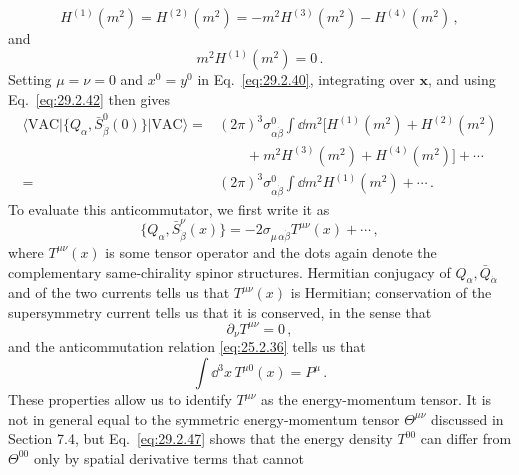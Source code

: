 \begin{equation}
  H^{(1)}(m^2)
  =H^{(2)}(m^2)
  =-m^2H^{(3)}(m^2)-H^{(4)}(m^2)\,,
  \tag{29.2.42}\label{eq:29.2.42}
\end{equation}
and
\begin{equation}
  m^2H^{(1)}(m^2)=0\,.
  \tag{29.2.43}\label{eq:29.2.43}
\end{equation}
Setting \(\mu=\nu=0\) and \(x^0=y^0\) in Eq.~\eqref{eq:29.2.40},
integrating over \(\mathbf x\), and using Eq.~\eqref{eq:29.2.42} then
gives
\begin{equation}
  \begin{aligned}
  \langle\mathrm{VAC}\lvert
  \{Q_\alpha,\bar S^0_{\dot\beta}(0)\}
  \rvert\mathrm{VAC}\rangle
  ={}&(2\pi)^3\sigma^0_{\alpha\dot\beta}\int \dd m^2
  \bigl[
    H^{(1)}(m^2)+H^{(2)}(m^2)
  \\
  &\qquad
    +m^2H^{(3)}(m^2)+H^{(4)}(m^2)
  \bigr]
  +\cdots
  \\
  ={}&(2\pi)^3\sigma^0_{\alpha\dot\beta}
    \int \dd m^2H^{(1)}(m^2)+\cdots\,.
  \end{aligned}
  \tag{29.2.44}\label{eq:29.2.44}
\end{equation}
To evaluate this anticommutator, we first write it as
\begin{equation}
  \{Q_\alpha,\bar S^\nu_{\dot\beta}(x)\}
  =-2\sigma_{\mu\,\alpha\dot\beta}T^{\mu\nu}(x)+\cdots\,,
  \tag{29.2.45}\label{eq:29.2.45}
\end{equation}
where \(T^{\mu\nu}(x)\) is some tensor operator and the dots again denote
the complementary same-chirality spinor structures. Hermitian conjugacy
of \(Q_\alpha,\bar Q_{\dot\alpha}\) and of the two currents tells us that
\(T^{\mu\nu}(x)\) is Hermitian; conservation of the supersymmetry current tells us that
it is conserved, in the sense that
\begin{equation}
  \partial_\nu T^{\mu\nu}=0\,,
  \tag{29.2.46}\label{eq:29.2.46}
\end{equation}
and the anticommutation relation \eqref{eq:25.2.36} tells us that
\begin{equation}
  \int \dd^3x\,T^{\mu0}(x)=P^\mu\,.
  \tag{29.2.47}\label{eq:29.2.47}
\end{equation}
These properties allow us to identify \(T^{\mu\nu}\) as the
energy-momentum tensor. It is not in general equal to the symmetric
energy-momentum tensor \(\Theta^{\mu\nu}\) discussed in Section 7.4, but
Eq.~\eqref{eq:29.2.47} shows that the energy density \(T^{00}\) can
differ from \(\Theta^{00}\) only by spatial derivative terms that cannot

